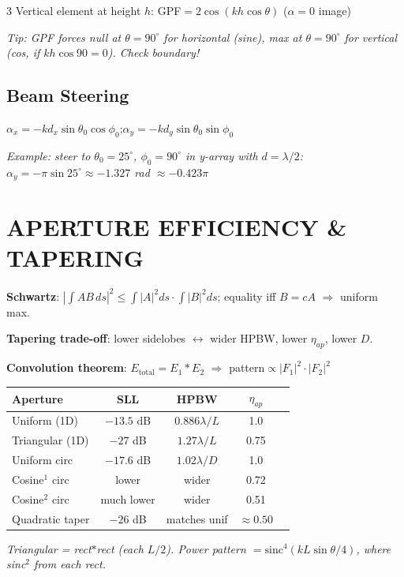 \documentclass[6pt,landscape]{article}
\begin{document}
\begin{multicols}{3}
Vertical element at height $h$: GPF$=2\cos(kh\cos\theta)$ ($\alpha=0$ image)

\textit{Tip: GPF forces null at $\theta=90^\circ$ for horizontal (sine), max at $\theta=90^\circ$ for vertical (cos, if $kh\cos90=0$). Check boundary!}

\subsection*{Beam Steering}
$\alpha_x=-kd_x\sin\theta_0\cos\phi_0$;\quad$\alpha_y=-kd_y\sin\theta_0\sin\phi_0$

\textit{Example: steer to $\theta_0=25^\circ$, $\phi_0=90^\circ$ in y-array with $d=\lambda/2$: $\alpha_y=-\pi\sin25^\circ\approx-1.327$ rad $\approx-0.423\pi$}

\section*{APERTURE EFFICIENCY \& TAPERING}

\textbf{Schwartz}: $|\int AB\,ds|^2\leq\int|A|^2ds\cdot\int|B|^2ds$; equality iff $B=cA$ $\Rightarrow$ uniform max.

\textbf{Tapering trade-off}: lower sidelobes $\leftrightarrow$ wider HPBW, lower $\eta_{ap}$, lower $D$.

\textbf{Convolution theorem}: $E_\text{total}=E_1*E_2$ $\Rightarrow$ pattern$\propto|F_1|^2\cdot|F_2|^2$

\begin{center}
\begin{tabular}{lcccc}
\toprule
Aperture & SLL & HPBW & $\eta_{ap}$\\
\midrule
Uniform (1D) & $-13.5$ dB & $0.886\lambda/L$ & 1.0\\
Triangular (1D) & $-27$ dB & $1.27\lambda/L$ & 0.75\\
Uniform circ & $-17.6$ dB & $1.02\lambda/D$ & 1.0\\
Cosine$^1$ circ & lower & wider & 0.72\\
Cosine$^2$ circ & much lower & wider & 0.51\\
Quadratic taper & $-26$ dB & matches unif & $\approx0.50$\\
\bottomrule
\end{tabular}
\end{center}

\textit{Triangular = rect$*$rect (each $L/2$). Power pattern $=\text{sinc}^4(kL\sin\theta/4)$, where sinc$^2$ from each rect.}


\end{multicols}
\end{document}
